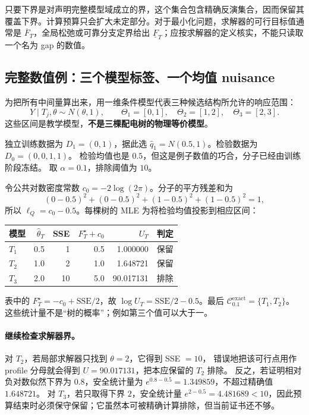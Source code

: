 只要下界是对声明完整模型域成立的界，这个集合包含精确反演集合，因而保留其覆盖下界。计算预算只会扩大未定部分。对于最小化问题，求解器的可行目标值通常是 $\overline F_T$，全局松弛或可靠分支定界给出 $\underline F_T$；应按求解器的定义核实，不能只读取一个名为 gap 的数值。

\subsection{完整数值例：三个模型标签、一个均值 nuisance}

为把所有中间量算出来，用一维条件模型代表三种候选结构所允许的响应范围：
\[
 Y\mid T_j,\theta\sim N(\theta,1),\qquad
 \Theta_1=[0,1],\quad\Theta_2=[1,2],\quad\Theta_3=[2,3].
\]
这些区间是教学模型，\textbf{不是三棵配电树的物理等价模型}。

独立训练数据为 $D_1=(0,1)$，据此选
$\widehat q_1=N(0.5,1)$。检验数据为 $D_0=(0,0,1,1)$。
检验均值也是 $0.5$，但这是例子数值的巧合，分子已经由训练阶段冻结。
取 $\alpha=0.1$，排除阈值为 $10$。

令公共对数密度常数 $c_0=-2\log(2\pi)$。分子的平方残差和为
\[
 (0-0.5)^2+(0-0.5)^2+(1-0.5)^2+(1-0.5)^2=1,
\]
所以 $\ell_Q=c_0-0.5$。每棵树的 MLE 为将检验均值投影到相应区间：
\begin{center}
\begin{tabular}{lrrrrl}
\toprule
模型 & $\widehat\theta_T$ & SSE & $F_T^\star+c_0$ & $U_T$ & 判定\\
\midrule
$T_1$ & 0.5 & 1 & 0.5 & 1.000000 & 保留\\
$T_2$ & 1.0 & 2 & 1.0 & 1.648721 & 保留\\
$T_3$ & 2.0 & 10 & 5.0 & 90.017131 & 排除\\
\bottomrule
\end{tabular}
\end{center}
表中的 $F_T^\star=-c_0+\mathrm{SSE}/2$，故
$\log U_T=\mathrm{SSE}/2-0.5$。最后
$\mathcal C_{0.1}^{\mathrm{exact}}=\{T_1,T_2\}$。
这些统计量不是“树的概率”；例如第三个值可以大于一。

\paragraph{继续检查求解器界。}
对 $T_2$，若局部求解器只找到 $\theta=2$，它得到 SSE $=10$，
错误地把该可行点用作 profile 分母就会得到 $U=90.017131$，把本应保留的 $T_2$ 排除。
反之，若证明相对负对数似然下界为 $0.8$，安全统计量为
$e^{0.8-0.5}=1.349859$，不超过精确值 $1.648721$。
对 $T_3$，若只取得下界 $2$，安全统计量
$e^{2-0.5}=4.481689<10$，因此预算结束时必须保守保留；它虽然本可被精确计算排除，但当前证书还不够。

